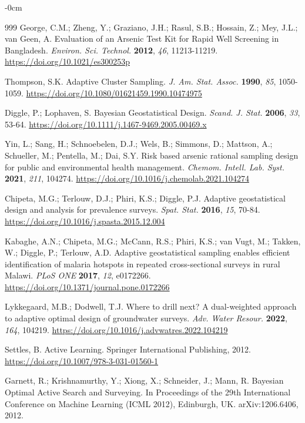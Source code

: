 \documentclass[sustainability,article,submit,pdftex,moreauthors]{Definitions/mdpi}
\begin{document}
\begin{adjustwidth}{-\extralength}{0cm}
\begin{thebibliography}{999}
George, C.M.; Zheng, Y.; Graziano, J.H.; Rasul, S.B.; Hossain, Z.; Mey, J.L.; van Geen, A. Evaluation of an Arsenic Test Kit for Rapid Well Screening in Bangladesh. \textit{Environ. Sci. Technol.} \textbf{2012}, \textit{46}, 11213-11219. \url{https://doi.org/10.1021/es300253p}

Thompson, S.K. Adaptive Cluster Sampling. \textit{J. Am. Stat. Assoc.} \textbf{1990}, \textit{85}, 1050-1059. \url{https://doi.org/10.1080/01621459.1990.10474975}

Diggle, P.; Lophaven, S. Bayesian Geostatistical Design. \textit{Scand. J. Stat.} \textbf{2006}, \textit{33}, 53-64. \url{https://doi.org/10.1111/j.1467-9469.2005.00469.x}

Yin, L.; Sang, H.; Schnoebelen, D.J.; Wels, B.; Simmons, D.; Mattson, A.; Schueller, M.; Pentella, M.; Dai, S.Y. Risk based arsenic rational sampling design for public and environmental health management. \textit{Chemom. Intell. Lab. Syst.} \textbf{2021}, \textit{211}, 104274. \url{https://doi.org/10.1016/j.chemolab.2021.104274}

Chipeta, M.G.; Terlouw, D.J.; Phiri, K.S.; Diggle, P.J. Adaptive geostatistical design and analysis for prevalence surveys. \textit{Spat. Stat.} \textbf{2016}, \textit{15}, 70-84. \url{https://doi.org/10.1016/j.spasta.2015.12.004}

Kabaghe, A.N.; Chipeta, M.G.; McCann, R.S.; Phiri, K.S.; van Vugt, M.; Takken, W.; Diggle, P.; Terlouw, A.D. Adaptive geostatistical sampling enables efficient identification of malaria hotspots in repeated cross-sectional surveys in rural Malawi. \textit{PLoS ONE} \textbf{2017}, \textit{12}, e0172266. \url{https://doi.org/10.1371/journal.pone.0172266}

Lykkegaard, M.B.; Dodwell, T.J. Where to drill next? A dual-weighted approach to adaptive optimal design of groundwater surveys. \textit{Adv. Water Resour.} \textbf{2022}, \textit{164}, 104219. \url{https://doi.org/10.1016/j.advwatres.2022.104219}

Settles, B. Active Learning. Springer International Publishing, 2012. \url{https://doi.org/10.1007/978-3-031-01560-1}

Garnett, R.; Krishnamurthy, Y.; Xiong, X.; Schneider, J.; Mann, R. Bayesian Optimal Active Search and Surveying. In Proceedings of the 29th International Conference on Machine Learning (ICML 2012), Edinburgh, UK. arXiv:1206.6406, 2012.


\end{thebibliography}
\end{adjustwidth}
\end{document}
